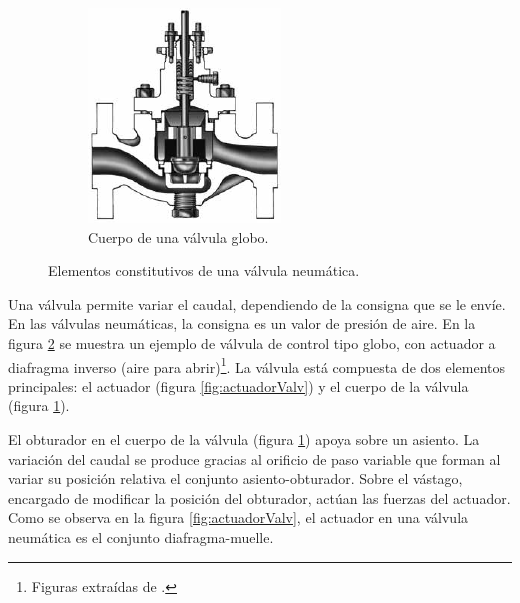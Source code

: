 \begin{figure}[ht]
\begin{subfigure}[b]{0.36\textwidth}
\includegraphics[width=\textwidth]{Cap2-DisenoEnsamblado/images/ValvGlob.pdf}
                \caption{Cuerpo de una válvula globo.}
                \label{fig:cuerpoValv}
        \end{subfigure}
        \caption{Elementos constitutivos de una válvula neumática.}
        \label{fig:elementosValv}
\end{figure}

Una válvula permite variar el caudal, dependiendo de la consigna que se
le envíe.
En las válvulas neumáticas, la consigna es un valor de presión de aire.
En la figura \ref{fig:elementosValv} se muestra un ejemplo de válvula de control
tipo globo, con actuador a diafragma inverso (aire para
abrir)\footnote{Figuras extraídas de \cite{bib:controlValveHandbook}.}.
La válvula está compuesta de dos elementos principales: el actuador
(figura \ref{fig:actuadorValv}) y el cuerpo de la válvula (figura
\ref{fig:cuerpoValv}).

El obturador en el cuerpo de la válvula (figura \ref{fig:cuerpoValv}) apoya
sobre un asiento.
La variación del caudal se produce gracias al orificio de paso variable
que forman al variar su posición relativa el conjunto asiento-obturador.
Sobre el vástago, encargado de modificar la posición del obturador,
actúan las fuerzas del actuador.
Como se observa en la figura \ref{fig:actuadorValv}, el actuador en una válvula
neumática es el conjunto diafragma-muelle.

